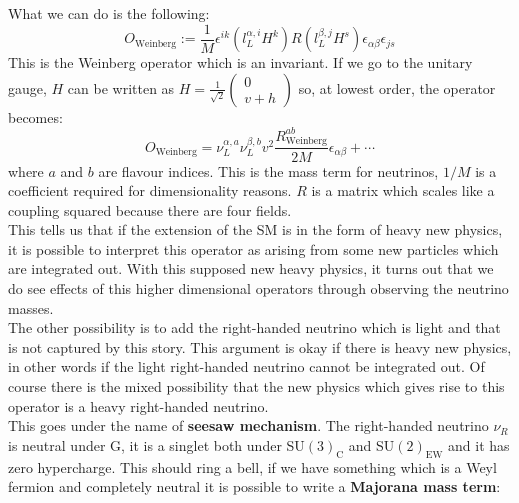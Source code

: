 \documentclass[../main.tex]{subfiles}
\begin{document}
What we can do is the following:
\[
O_{\text{Weinberg}}:=\frac{1}{M}\epsilon^{ik}(l_L^{\alpha,i}H^k)R(l_L^{\beta,j}H^s)\epsilon_{\alpha\beta}\epsilon_{js}
\]
This is the Weinberg operator which is an invariant. If we go to the unitary gauge, $H$ can be written as $H=\frac{1}{\sqrt{2}}\begin{pmatrix}0\\v+h\end{pmatrix}$ so, at lowest order, the operator becomes:
\[
O_{\text{Weinberg}}=\nu_L^{\alpha,a}\nu_L^{\beta,b}v^2\frac{R^{ab}_{\text{Weinberg}}}{2M}\epsilon_{\alpha\beta}+\cdots
\]
where $a$ and $b$ are flavour indices. This is the mass term for neutrinos, $1/M$ is a coefficient required for dimensionality reasons. $R$ is a matrix which scales like a coupling squared because there are four fields.\\ 
This tells us that if the extension of the SM is in the form of heavy new physics, it is possible to interpret this operator as arising from some new particles which are integrated out. With this supposed new heavy physics, it turns out that we do see effects of this higher dimensional operators through observing the neutrino masses.\\
The other possibility is to add the right-handed neutrino which is light and that is not captured by this story. This argument is okay if there is heavy new physics, in other words if the light right-handed neutrino cannot be integrated out. Of course there is the mixed possibility that the new physics which gives rise to this operator is a heavy right-handed neutrino.\\
This goes under the name of \textbf{seesaw mechanism}. The right-handed neutrino $\nu_R$ is neutral under G, it is a singlet both under SU$(3)_{\text{C}}$ and SU$(2)_{\text{EW}}$ and it has zero hypercharge. This should ring a bell, if we have something which is a Weyl fermion and completely neutral it is possible to write a \textbf{Majorana mass term}:
\end{document}
